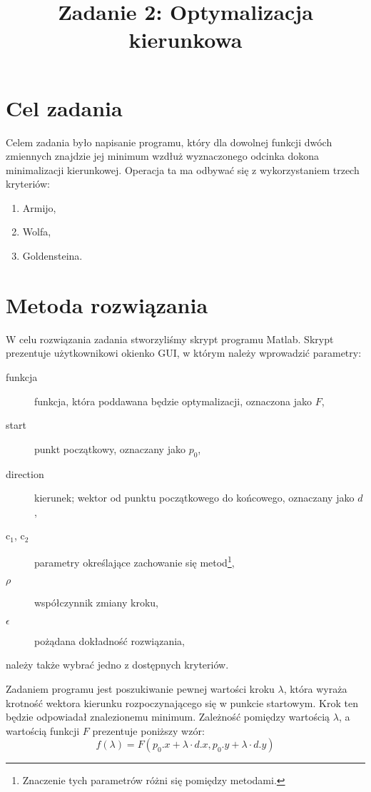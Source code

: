\documentclass{classrep}
\author{%
  \studentinfo{Michał Janiszewski}{169485} \and
  \studentinfo{Leszek Wach}{169513}
}
\title{Zadanie 2: Optymalizacja kierunkowa}
\begin{document}
\maketitle

\section{Cel zadania}
Celem zadania było napisanie programu, który dla dowolnej funkcji dwóch zmiennych znajdzie jej minimum wzdłuż wyznaczonego odcinka \ppauza dokona minimalizacji kierunkowej. Operacja ta ma odbywać się z wykorzystaniem trzech kryteriów:
\begin{enumerate}
 \item Armijo,
 \item Wolfa,
 \item Goldensteina.
\end{enumerate}

\section{Metoda rozwiązania}
W celu rozwiązania zadania stworzyliśmy skrypt programu Matlab. Skrypt prezentuje użytkownikowi okienko GUI, w którym należy wprowadzić parametry:
\begin{description}
 \item[funkcja] funkcja, która poddawana będzie optymalizacji, oznaczona jako $F$,
 \item[start] punkt początkowy, oznaczany jako $p_0$,
 \item[direction] kierunek; wektor od punktu początkowego do końcowego, oznaczany jako $d$,
 \item[c$_1$, c$_2$] parametry określające zachowanie się metod\footnote{Znaczenie tych parametrów różni się pomiędzy metodami.},
 \item[$\rho$] współczynnik zmiany kroku,
 \item[$\epsilon$] pożądana dokładność rozwiązania,
\end{description}
należy także wybrać jedno z dostępnych kryteriów.

Zadaniem programu jest poszukiwanie pewnej wartości kroku $\lambda$, która wyraża krotność wektora kierunku rozpoczynającego się w punkcie startowym. Krok ten będzie odpowiadał znalezionemu minimum. Zależność pomiędzy wartością $\lambda$, a wartością funkcji $F$ prezentuje poniższy wzór:
\begin{equation}
 f(\lambda) = F(p_0.x + \lambda \cdot d.x, p_0.y + \lambda \cdot d.y)
\end{equation}
\end{document}
